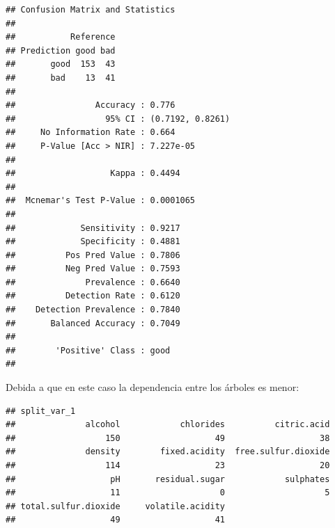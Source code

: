 \documentclass[]{book}
\newenvironment{Shaded}{\begin{snugshade}}{\end{snugshade}}
\newcommand{\KeywordTok}[1]{\textcolor[rgb]{0.13,0.29,0.53}{\textbf{#1}}}
\newcommand{\DataTypeTok}[1]{\textcolor[rgb]{0.13,0.29,0.53}{#1}}
\newcommand{\DecValTok}[1]{\textcolor[rgb]{0.00,0.00,0.81}{#1}}
\newcommand{\StringTok}[1]{\textcolor[rgb]{0.31,0.60,0.02}{#1}}
\newcommand{\OtherTok}[1]{\textcolor[rgb]{0.56,0.35,0.01}{#1}}
\newcommand{\ControlFlowTok}[1]{\textcolor[rgb]{0.13,0.29,0.53}{\textbf{#1}}}
\newcommand{\OperatorTok}[1]{\textcolor[rgb]{0.81,0.36,0.00}{\textbf{#1}}}
\newcommand{\NormalTok}[1]{#1}
\theoremstyle{break}
\theoremstyle{definition}
\theoremstyle{definition}
\theoremstyle{definition}
\theoremstyle{remark}
\begin{document}
\begin{verbatim}
## Confusion Matrix and Statistics
## 
##           Reference
## Prediction good bad
##       good  153  43
##       bad    13  41
##                                           
##                Accuracy : 0.776           
##                  95% CI : (0.7192, 0.8261)
##     No Information Rate : 0.664           
##     P-Value [Acc > NIR] : 7.227e-05       
##                                           
##                   Kappa : 0.4494          
##                                           
##  Mcnemar's Test P-Value : 0.0001065       
##                                           
##             Sensitivity : 0.9217          
##             Specificity : 0.4881          
##          Pos Pred Value : 0.7806          
##          Neg Pred Value : 0.7593          
##              Prevalence : 0.6640          
##          Detection Rate : 0.6120          
##    Detection Prevalence : 0.7840          
##       Balanced Accuracy : 0.7049          
##                                           
##        'Positive' Class : good            
## 
\end{verbatim}

Debida a que en este caso la dependencia entre los árboles es menor:

\begin{Shaded}
\end{Shaded}

\begin{verbatim}
## split_var_1
##              alcohol            chlorides          citric.acid 
##                  150                   49                   38 
##              density        fixed.acidity  free.sulfur.dioxide 
##                  114                   23                   20 
##                   pH       residual.sugar            sulphates 
##                   11                    0                    5 
## total.sulfur.dioxide     volatile.acidity 
##                   49                   41
\end{verbatim}
\end{document}
